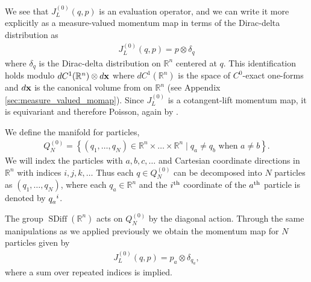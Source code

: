 \documentclass[12pt]{amsart}
\newcommand{\R}{\ensuremath{\mathbb{R}}}
\newcommand{\dx}{\ensuremath{\textrm{d}x}}
\DeclareMathOperator{\SDiff}{SDiff}
\begin{document}
We see that $J_L^{(0)}(q,p)$ is an evaluation operator, and we can write it 
more explicitly as a measure-valued momentum map in terms of the Dirac-delta distribution as
\begin{align*}
  J_L^{(0)}( q , p ) = p \otimes \delta_q
\end{align*}
where $\delta_q$ is the Dirac-delta distribution on $\R^n$ centered at $q$.
This identification holds modulo $dC^1(\R^n) \otimes d{\bf x}$ where $dC^1(\R^n)$
is the space of $C^0$-exact one-forms and $d{\bf x}$ is the canonical volume from on $\R^n$
(see Appendix \ref{sec:measure_valued_momap}).
Since $J_L^{(0)}$ is a cotangent-lift momentum map, it is equivariant and therefore Poisson, again by \cite[Thm~12.4.9]{MandS}.

We define the manifold for particles,
\begin{align*}
  Q_N^{(0)} = \left\{ (q_1,\dots,q_N) \in \R^n \times \dots\times \R^n
                 \mid q_a \neq q_b \text{ when } a \neq b \right\}.
\end{align*}
We will index the particles with $a,b,c,\dots$ and Cartesian coordinate
directions in $\R^n$ with indices $i,j,k,\dots$
Thus each $q \in Q_N^{(0)}$ can be decomposed
into $N$ particles as $(q_1,\dots,q_N)$, where each $q_a \in \R^n$
and the $i^{\rm th}$ coordinate of the $a^{\rm th}$ particle
is denoted by $q\indices{_a^i}$.

The group $\SDiff(\R^n)$ acts on $Q_N^{(0)}$ by the diagonal action.
Through the same manipulations as we applied previously we obtain the
momentum map for $N$ particles given by
\begin{align*}
  J_L^{(0)}(q,p) = p_a \otimes \delta_{q_a},
\end{align*}
where a sum over repeated indices is implied.
\end{document}
